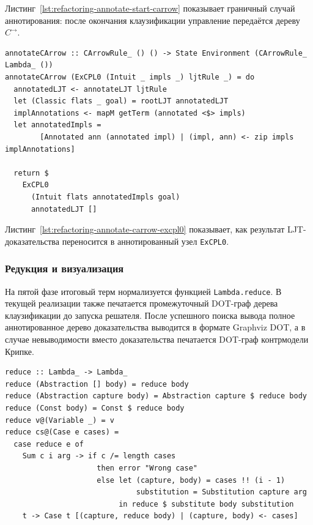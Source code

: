 \documentclass[14pt, russian]{scrartcl}
\begin{document}
Листинг~\ref{lst:refactoring-annotate-start-carrow} показывает граничный случай
аннотирования: после окончания клаузификации управление передаётся дереву
$C^{\rightarrow}$.

\begin{listing}[!htb]
\caption{Аннотирование правила \texttt{ExCPL0}: \texttt{annotateCArrow}}
\label{lst:refactoring-annotate-carrow-excpl0}
\begin{verbatim}
annotateCArrow :: CArrowRule_ () () -> State Environment (CArrowRule_ Lambda_ ())
annotateCArrow (ExCPL0 (Intuit _ impls _) ljtRule _) = do
  annotatedLJT <- annotateLJT ljtRule
  let (Classic flats _ goal) = rootLJT annotatedLJT
  implAnnotations <- mapM getTerm (annotated <$> impls)
  let annotatedImpls =
        [Annotated ann (annotated impl) | (impl, ann) <- zip impls implAnnotations]

  return $
    ExCPL0
      (Intuit flats annotatedImpls goal)
      annotatedLJT []
\end{verbatim}
\end{listing}

Листинг~\ref{lst:refactoring-annotate-carrow-excpl0} показывает, как результат
LJT-доказательства переносится в аннотированный узел \texttt{ExCPL0}.

\subsubsection{Редукция и визуализация}

На пятой фазе итоговый терм нормализуется функцией \texttt{Lambda.reduce}.
В текущей реализации также печатается промежуточный DOT-граф дерева
клаузификации до запуска решателя. После успешного поиска вывода полное
аннотированное дерево доказательства выводится в формате Graphviz DOT, а в
случае невыводимости вместо доказательства печатается DOT-граф контрмодели
Крипке.

\begin{listing}[!htb]
\caption{Фрагмент функции редукции \texttt{reduce}}
\label{lst:refactoring-reduce}
\begin{verbatim}
reduce :: Lambda_ -> Lambda_
reduce (Abstraction [] body) = reduce body
reduce (Abstraction capture body) = Abstraction capture $ reduce body
reduce (Const body) = Const $ reduce body
reduce v@(Variable _) = v
reduce cs@(Case e cases) =
  case reduce e of 
    Sum c i arg -> if c /= length cases
                     then error "Wrong case"
                     else let (capture, body) = cases !! (i - 1)
                              substitution = Substitution capture arg
                          in reduce $ substitute body substitution
    t -> Case t [(capture, reduce body) | (capture, body) <- cases]
\end{verbatim}
\end{listing}
\end{document}
